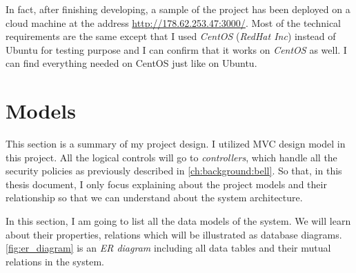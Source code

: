 In fact, after finishing developing, a sample of the project has been deployed on a cloud machine at the address \href{http://178.62.253.47:3000/}{http://178.62.253.47:3000/}.
Most of the technical requirements are the same except that I used \emph{CentOS} (\emph{RedHat Inc}) instead of Ubuntu for testing purpose and I can confirm that it works on \emph{CentOS} as well.
I can find everything needed on CentOS just like on Ubuntu.


\section{Models}
\label{ch:implementation:models}

This section is a summary of my project design.
I utilized MVC design model in this project.
All the logical controls will go to \emph{controllers}, which handle all the security policies as previously described in \autoref{ch:background:bell}.
So that, in this thesis document, I only focus explaining about the project models and their relationship so that we can understand about the system architecture.

In this section, I am going to list all the data models of the system.
We will learn about their properties, relations which will be illustrated as database diagrams.
\autoref{fig:er_diagram} is an \emph{ER diagram} including all data tables and their mutual relations in the system.

